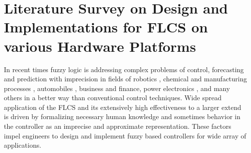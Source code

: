 \section{Literature Survey on Design and Implementations for FLCS on various Hardware Platforms}
In recent times fuzzy logic is addressing complex problems of control, forecasting and prediction with imprecision in fields of robotics \cite{Linda2011,Acevedo2013,Das2006,Lochan2015,Das2006,Gopinath2008}, chemical \cite{Foerster2013,Pan2005,Aqlan2014,Khoshnevisan2014,Lerkkasemsan2014,Shamiri2015} and manufacturing processes \cite{Zammar2015,Rajak2015,Gokulachandran2015}, automobiles \cite{Wang2015,Baldania2014,Basjaruddin2015,Li2014b,Bogdan2008}, business and finance\cite{Korol2014,Tung2004,Yoshida2003,Dostal2013}, power electronics \cite{Bhende2006,Lou2015,AlNabulsi2012}, and many others\cite{Dostal2013,Kumar2015,Kumar2015a,Sun2015,Boumaaraf2015,Jadoun2015} in a better way than conventional control techniques. Wide spread application of the FLCS and its extensively high effectiveness to a larger extend
is driven by formalizing necessary human knowledge and sometimes behavior in the controller as an imprecise and approximate representation. These factors impel engineers to design and implement fuzzy based controllers for wide array of applications.

